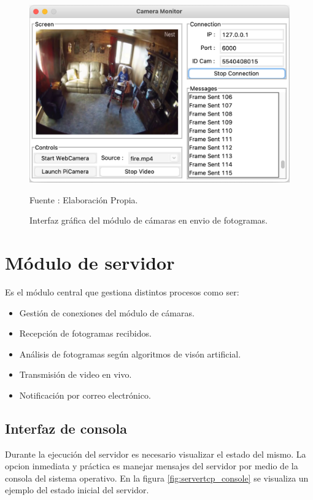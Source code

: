 \begin{figure}[H]
    \begin{center}
        \includegraphics[width=12cm]{img/capitulo_5/camera_working.png}
    \end{center}
    \begin{center}
        \caption{Interfaz gráfica del módulo de cámaras en envio de fotogramas.}
        Fuente : Elaboración Propia.
        \label{fig:working_camera}
    \end{center}
\end{figure}


\section{Módulo de servidor}
Es el módulo central que gestiona distintos procesos como ser: 
\begin{itemize}
    \item Gestión de conexiones del módulo de cámaras.
    \item Recepción de fotogramas recibidos.
    \item Análisis de fotogramas según algoritmos de visón artificial.
    \item Transmisión de video en vivo.
    \item Notificación por correo electrónico.
\end{itemize}
\subsection{Interfaz de consola}
Durante la ejecución del servidor es necesario visualizar el estado del mismo. La opcion inmediata y práctica es manejar mensajes del servidor por medio de la consola del sistema operativo. En la figura \ref{fig:servertcp_console} se visualiza un ejemplo del estado inicial del servidor.

